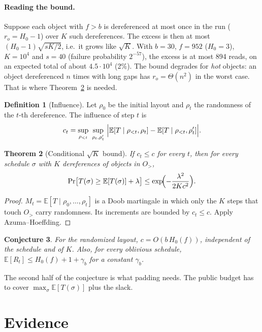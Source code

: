 \documentclass[11pt]{article}
\newtheorem{theorem}{Theorem}
\newtheorem{conjecture}[theorem]{Conjecture}
\theoremstyle{definition}
\newtheorem{definition}[theorem]{Definition}
\newcommand{\E}{\mathbb{E}}
\begin{document}
\paragraph{Reading the bound.}
Suppose each object with $f>b$ is dereferenced at most once in the run
($r_o=H_0-1$) over $K$ such dereferences. The excess is then at most
$(H_0-1)\sqrt{sK/2}$, i.e.\ it grows like $\sqrt K$. With $b=30$, $f=952$
($H_0=3$), $K=10^4$ and $s=40$ (failure probability $2^{-57}$), the excess is at
most 894 reads, on an expected total of about $4.5\cdot 10^4$ (2\%). The bound
degrades for \emph{hot} objects: an object dereferenced $n$ times with long gaps
has $r_o=\Theta(n^2)$ in the worst case. That is where
Theorem~\ref{thm:cond} is needed.

\begin{definition}[Influence]
Let $\rho_0$ be the initial layout and $\rho_t$ the randomness of the $t$-th
dereference. The influence of step $t$ is
\[
c_t=\sup_{\rho_{<t}}\ \sup_{\rho_t,\rho_t'}\
\Bigl|\E[T\mid \rho_{<t},\rho_t]-\E[T\mid \rho_{<t},\rho_t']\Bigr|.
\]
\end{definition}

\begin{theorem}[Conditional $\sqrt K$ bound]\label{thm:cond}
If $c_t\le c$ for every $t$, then for every schedule $\sigma$ with $K$
dereferences of objects in $O_>$,
\[
\Pr\bigl[T(\sigma)\ge \E[T(\sigma)]+\lambda\bigr]\le \exp\!\Bigl(-\frac{\lambda^2}{2Kc^2}\Bigr).
\]
\end{theorem}
\begin{proof}
$M_t=\E[T\mid\rho_0,\dots,\rho_t]$ is a Doob martingale in which only the
$K$ steps that touch $O_>$ carry randomness. Its increments are bounded by
$c_t\le c$. Apply Azuma--Hoeffding.
\end{proof}

\begin{conjecture}\label{conj}
For the randomized layout, $c=O(b\,H_0(f))$, independent of the schedule
and of $K$. Also, for every oblivious schedule,
$\E[R_t]\le H_0(f)+1+\gamma_b$ for a constant $\gamma_b$.
\end{conjecture}

The second half of the conjecture is what padding needs. The public budget has
to cover $\max_\sigma \E[T(\sigma)]$ plus the slack.

\section{Evidence}
\end{document}
